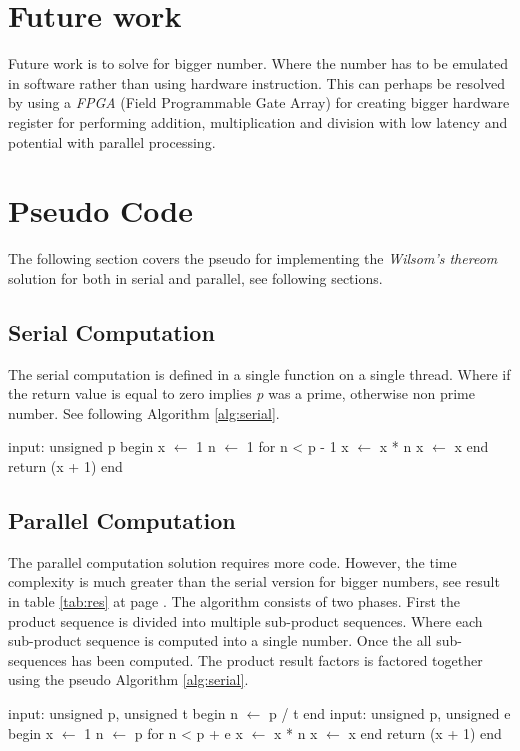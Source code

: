 \documentclass[12pt, oneside, onecolumn]{article}
\begin{document}

%
\section{Future work}
Future work is to solve for bigger number. Where the number has to be emulated in software rather than using hardware instruction. This can perhaps be resolved by using a \textit{FPGA} (Field Programmable Gate Array) for creating bigger hardware register for performing addition, multiplication and division with low latency and potential with parallel processing.

\section{Pseudo Code}
The following section covers the pseudo for implementing the \emph{Wilsom's thereom} solution for both in serial and parallel, see following sections.

\subsection{Serial Computation}
The serial computation is defined in a single function on a single thread. Where if the return value is equal to zero implies \emph{p} was a prime, otherwise non prime number. See following Algorithm \ref{alg:serial}.
\begin{algorithm}[caption={Serial Computation.},label={alg:serial}]
input: unsigned p
begin
	x $\gets$ 1
	n $\gets$ 1
	for n < p - 1
		x $\gets$ x * n
		x $\gets$ x %
	end
	return (x + 1) %
end
\end{algorithm}

\subsection{Parallel Computation}
The parallel computation solution requires more code. However, the time complexity is much greater than the serial version for bigger numbers, see result in table \ref{tab:res} at page \pageref{tab:res}.
The algorithm consists of two phases. First the product sequence is divided into multiple sub-product sequences. Where each sub-product sequence is computed into a single number. Once the all sub-sequences has been computed. The product result factors is factored together using the pseudo Algorithm \ref{alg:serial}.

\begin{algorithm}[caption={Wilsom's Prime - Parallel Computation.},label={alg:parallel}]
input: unsigned p, unsigned t
begin
	n $\gets$ p / t
end
input: unsigned p, unsigned e
begin
	x $\gets$ 1
	n $\gets$ p
	for n < p + e
		x $\gets$ x * n
		x $\gets$ x %
	end
	return (x + 1) %
end
\end{algorithm}



\end{document}
